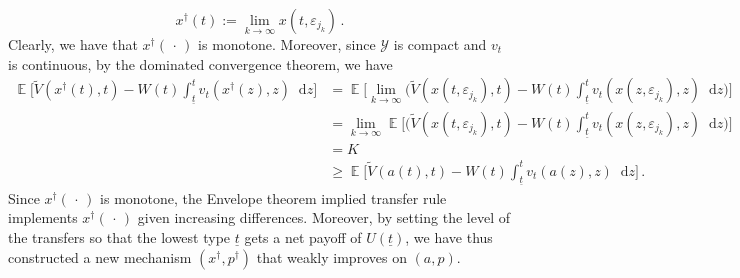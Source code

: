 \documentclass[12pt,letterpaper]{article}
\newenvironment{original}{\color{black}\noindent}{}
\theoremstyle{plain}
\theoremstyle{definition}
\theoremstyle{remark}
\DeclareMathOperator{\E}{\mathds{E}}
\newcommand{\Y}{\mathcal{Y}}
\renewcommand{\1}{\mathds{1}}
\renewcommand{\epsilon}{\varepsilon}
\renewcommand*\d{\mathop{}\!\mathrm{d}}
\theoremstyle{definition}
\begin{document}
\begin{original}
\[x^\dagger(t):= \lim_{k\rightarrow\infty} x(t, \epsilon_{j_k})\,.\]
Clearly, we have that $x^\dagger(\,\cdot\,)$ is monotone. Moreover, since $\Y$ is compact and $v_t$ is continuous, by the dominated convergence theorem, we have
\begin{align*}
    \E\Bigg[\widetilde{V}(x^\dagger(t), t) - W(t) \int_{\underline{t}}^t v_t(x^\dagger(z), z) \d z \Bigg] &= \E\Bigg[\lim_{k\rightarrow \infty}\Big(\widetilde{V}(x(t, \varepsilon_{j_k}), t) - W(t) \int_{\underline{t}}^t v_t(x(z, \varepsilon_{j_k}), z) \d z \Big)\Bigg]\\
    &= \lim_{k\rightarrow \infty} \E\Bigg[\Big(\widetilde{V}(x(t, \varepsilon_{j_k}), t) - W(t) \int_{\underline{t}}^t v_t(x(z, \varepsilon_{j_k}), z) \d z \Big)\Bigg]\\
    & = K \\
    & \geq \E\Bigg[\widetilde{V}(a(t), t) - W(t) \int_{\underline{t}}^t v_t(a(z), z) \d z \Bigg]\,.
\end{align*}
Since $x^\dagger(\,\cdot\,)$ is monotone, the Envelope theorem implied transfer rule implements $x^\dagger(\,\cdot\,)$ given increasing differences. Moreover, by setting the level of the transfers so that the lowest type $\underline{t}$ gets a net payoff of $U(\underline{t})$, we have thus constructed a new mechanism $(x^\dagger, p^\dagger)$ that weakly improves on $(a, p)$.
\end{original}
\end{document}
